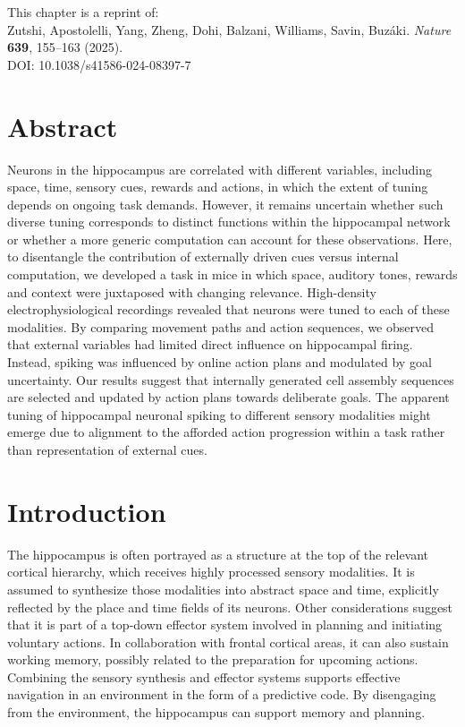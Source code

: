 This chapter is a reprint of: \\
Zutshi, Apostolelli, Yang, Zheng, Dohi, Balzani, Williams, Savin, Buz\'{a}ki. \textit{Nature} \textbf{639}, 155--163 (2025). \\
DOI: 10.1038/s41586-024-08397-7

\section*{Abstract}

Neurons in the hippocampus are correlated with different variables, including space, time, sensory cues, rewards and actions, in which the extent of tuning depends on ongoing task demands. However, it remains uncertain whether such diverse tuning corresponds to distinct functions within the hippocampal network or whether a more generic computation can account for these observations. Here, to disentangle the contribution of externally driven cues versus internal computation, we developed a task in mice in which space, auditory tones, rewards and context were juxtaposed with changing relevance. High-density electrophysiological recordings revealed that neurons were tuned to each of these modalities. By comparing movement paths and action sequences, we observed that external variables had limited direct influence on hippocampal firing. Instead, spiking was influenced by online action plans and modulated by goal uncertainty. Our results suggest that internally generated cell assembly sequences are selected and updated by action plans towards deliberate goals. The apparent tuning of hippocampal neuronal spiking to different sensory modalities might emerge due to alignment to the afforded action progression within a task rather than representation of external cues.

\section{Introduction}

The hippocampus is often portrayed as a structure at the top of the relevant cortical hierarchy, which receives highly processed sensory modalities. It is assumed to synthesize those modalities into abstract space and time, explicitly reflected by the place and time fields of its neurons. Other considerations suggest that it is part of a top-down effector system involved in planning and initiating voluntary actions. In collaboration with frontal cortical areas, it can also sustain working memory, possibly related to the preparation for upcoming actions. Combining the sensory synthesis and effector systems supports effective navigation in an environment in the form of a predictive code. By disengaging from the environment, the hippocampus can support memory and planning.

